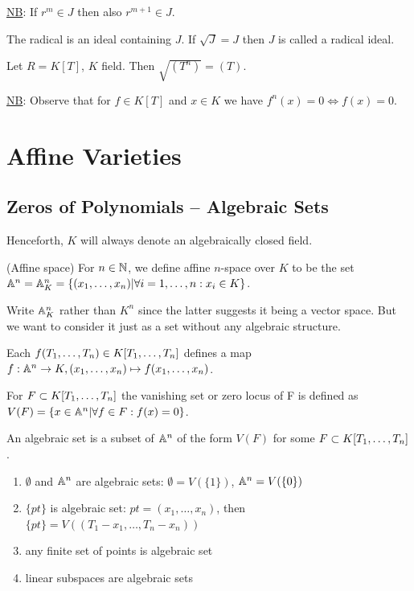 \documentclass[a4paper,11pt]{article}
\begin{document}
			\noindent\underline{NB}: If $r^m\in J$ then also $r^{m+1}\in J$.

			The radical is an ideal containing $J$. If $\sqrt{J}=J$ then $J$ is called a radical ideal.

			\begin{eg}
				Let $R=K[T]$, $K$ field. Then $\sqrt{(T^n)}=(T)$.
			\end{eg}

			\noindent\underline{NB}: Observe that for $f\in K[T]$ and $x\in K$ we have $f^n(x)=0\Longleftrightarrow f(x)=0$.



	\section{Affine Varieties}
		
		\subsection{Zeros of Polynomials -- Algebraic Sets}

			Henceforth, $K$ will always denote an algebraically closed field.

			\begin{defi}
				(Affine space) For $n\in \N$, we define affine $n$-space over $K$ to be the set $\AA^n=\AA^n_K=\{(x_1,\dots,x_n)|\forall i=1,\dots,n:x_i\in K\}$.
			\end{defi}

			\begin{remark}
				Write $\AA^n_K$ rather than $K^n$ since the latter suggests it being a vector space. But we want to consider it just as a set without any algebraic structure.
			\end{remark}

			Each $f(T_1,\dots,T_n)\in\K$ defines a map $f:\AA^n\rightarrow K, (x_1,\dots,x_n)\mapsto f(x_1,\dots,x_n)$.

			\begin{defi}
				For $F\subset\K$ the vanishing set or zero locus of F is defined as $V(F)=\{x\in\AA^n|\forall f\in F:f(x)=0\}$.
			\end{defi}

			\begin{defi}
				An algebraic set is a subset of $\AA^n$ of the form $V(F)$ for some $F\subset\K$.
			\end{defi}

			\begin{eg}
				\begin{enumerate}
					\item $\emptyset$ and $\AA^n$ are algebraic sets: $\emptyset=V(\{1\})$, $\AA^n=V(\{0\})$
					\item $\{pt\}$ is algebraic set: $pt=(x_1,\dots,x_n)$, then $\{pt\}=V((T_1-x_1,\dots,T_n-x_n))$
					\item any finite set of points is algebraic set
					\item linear subspaces are algebraic sets
				\end{enumerate}
			\end{eg}
\end{document}
